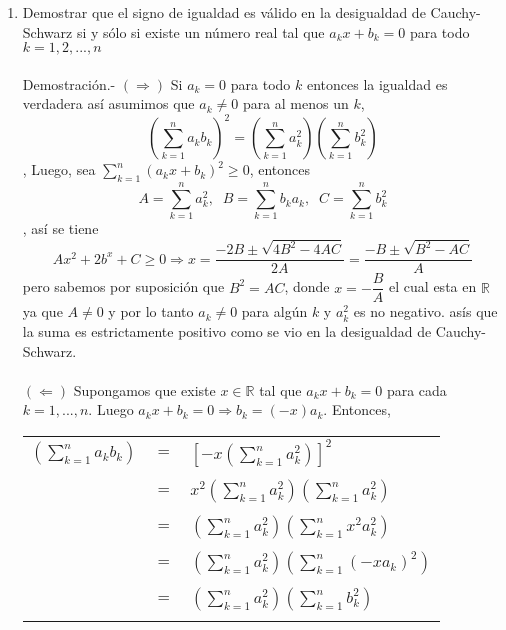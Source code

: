 \begin{enumerate}[ \bfseries 1.]
\item Demostrar que el signo de igualdad es válido en la desigualdad de Cauchy-Schwarz si y sólo si existe un número real tal que $a_k x + b_k = 0$ para todo $k=1,2,...,n$\\\\
Demostración.- $(\Rightarrow)$ \; Si $a_k=0$ para todo $k$ entonces la igualdad es verdadera así asumimos que $a_k\neq 0$ para al menos un $k$, $$\left( \displaystyle\sum_{k=1}^n a_k b_k \right)^2 = \left( \sum_{k=1}^n a_k^2 \right) \left( \sum_{k=1}^n b_k^2 \right)$$, Luego, sea $\sum\limits_{k=1}^n (a_k x + b_k)^2 \geq 0$, entonces $$A=\sum\limits_{k=1}^n a_k^2, \; \; B=\sum\limits_{k=1}^n b_k a_k, \; \; C= \sum\limits_{k=1}^n b_k^2$$, así se tiene $$Ax^2+2b^x + C \geq 0 \Rightarrow x= \dfrac{-2B \pm \sqrt{4B^2 - 4AC}}{2A} = \dfrac{-B \pm \sqrt{B^2 - AC}}{A}$$ pero sabemos por suposición que $B^2=AC$, donde $x=- \dfrac{B}{A}$ el cual esta en $\mathbb{R}$ ya que $A\neq 0$ y por lo tanto $a_k \neq 0$ para algún $k$ y $a_k^2$ es no negativo. asís que la suma es estrictamente positivo como se vio en la desigualdad de Cauchy-Schwarz.\\\\
$(\Leftarrow)$ Supongamos que existe $x\in \mathbb{R}$ tal que $a_k x + b_k=0$ para cada $k=1,...,n.$ Luego $a_k x + b_k = 0 \Rightarrow b_k =(-x)a_k.$ Entonces,
\begin{center}
\begin{tabular}{r c l}
$\left( \sum\limits_{k=1}^n a_k b_k \right)$&$=$&$\left[ -x \left( \sum\limits_{k=1}^n a_k^2 \right)\right]^2$\\\\
&$=$&$x^2 \left( \sum\limits_{k=1}^n a_k^2 \right)\left( \sum\limits_{k=1}^n a_k^2 \right)$\\\\
&$=$&$\left( \sum\limits_{k=1}^n a_k^2 \right) \left( \sum\limits_{k=1}^n x^2 a_k^2 \right)$\\\\
&$=$&$\left( \sum\limits_{k=1}^n a_k^2\right) \left( \sum\limits_{k=1}^n  (-xa_k)^2\right)$\\\\
&$=$&$\left( \sum\limits_{k=1}^n a_k^2 \right)\left( \sum\limits_{k=1}^n b_k^2\right)$\\\\
\end{tabular}
\end{center}
\end{enumerate}

